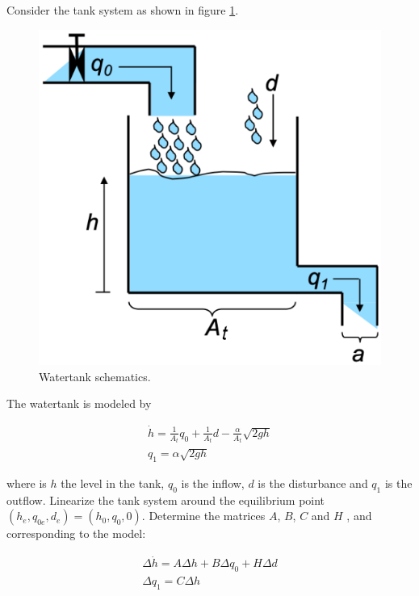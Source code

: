 Consider the tank system as shown in  figure \ref{Watertank_09}.
\begin{figure}[!htb]
\begin{center}
\includegraphics[scale=0.280]{img/state_feedback/Watertank_09.png}
\end{center}
\caption{Watertank schematics.}
\label{Watertank_09}
\end{figure}
The watertank is modeled by

\begin{eqnarray}
\dot{h} = \frac{1}{A_t}q_0 + \frac{1}{A_t}d - \frac{\alpha}{A_t}\sqrt{2gh} \nonumber \\
q_1 = \alpha \sqrt{2gh}   \nonumber
\end{eqnarray}

where is $h$ the level in the tank, $q_0$ is the inflow, $d$ is the disturbance and $q_1$ is the outflow.
Linearize the tank system around the equilibrium point $(h_e, q_{0e}, d_e) = (h_0, q_0, 0)$. Determine the matrices $A$, $B$, $C$ and $H$ , and corresponding to the model:

\begin{eqnarray}
\Delta \dot{h} = A \Delta h + B \Delta q_0 + H \Delta d  \nonumber \\
\Delta q_1 = C \Delta h \nonumber  
\end{eqnarray}

